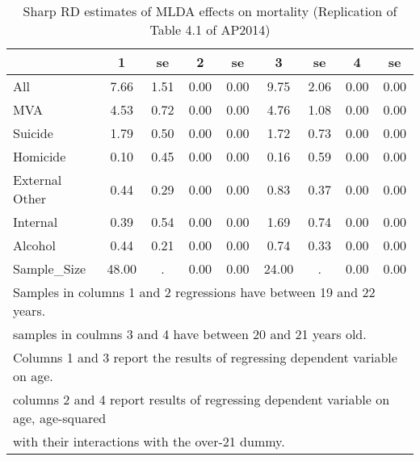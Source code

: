 \begin{table}[htbp]\centering
\caption{Sharp RD estimates of MLDA effects on mortality (Replication of Table 4.1 of AP2014) \label{tab::41}}
\begin{tabular*}{\hsize}{@{\hskip\tabcolsep\extracolsep\fill}l*{8}{c}}
\hline\hline
                    &           1&          se&           2&          se&           3&          se&           4&          se\\
\hline
All                 &        7.66&        1.51&        0.00&        0.00&        9.75&        2.06&        0.00&        0.00\\
MVA                 &        4.53&        0.72&        0.00&        0.00&        4.76&        1.08&        0.00&        0.00\\
Suicide             &        1.79&        0.50&        0.00&        0.00&        1.72&        0.73&        0.00&        0.00\\
Homicide            &        0.10&        0.45&        0.00&        0.00&        0.16&        0.59&        0.00&        0.00\\
External Other      &        0.44&        0.29&        0.00&        0.00&        0.83&        0.37&        0.00&        0.00\\
Internal            &        0.39&        0.54&        0.00&        0.00&        1.69&        0.74&        0.00&        0.00\\
Alcohol             &        0.44&        0.21&        0.00&        0.00&        0.74&        0.33&        0.00&        0.00\\
Sample\_Size         &       48.00&           .&        0.00&        0.00&       24.00&           .&        0.00&        0.00\\
\hline\hline
\multicolumn{9}{l}{\footnotesize Samples in columns 1 and 2 regressions have between 19 and 22 years.}\\
\multicolumn{9}{l}{\footnotesize samples in coulmns 3 and 4 have between 20 and 21 years old.}\\
\multicolumn{9}{l}{\footnotesize Columns 1 and 3 report the results of regressing dependent variable on age.}\\
\multicolumn{9}{l}{\footnotesize columns 2 and 4 report results of regressing dependent variable on age, age-squared}\\
\multicolumn{9}{l}{\footnotesize with their interactions with the over-21 dummy.}\\
\end{tabular*}
\end{table}
